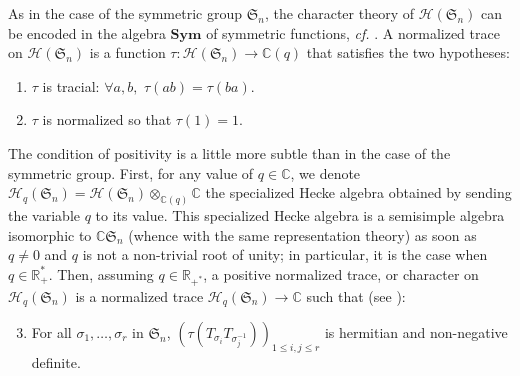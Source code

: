 \documentclass[smallextended,nospthms]{svjour3}
\theoremstyle{remark}
\newcommand{\R}{\mathbb{R}}
\newcommand{\C}{\mathbb{C}}
\newcommand{\hecke}{\mathscr{H}}
\newcommand{\sym}{\mathfrak{S}}
\newcommand{\Sym}{\mathbf{Sym}}
\begin{document}
As in the case of the symmetric group $\sym_{n}$, the character theory of $\hecke(\sym_{n})$ can be encoded in the algebra $\Sym$ of symmetric functions, \emph{cf.} \cite{Ram91}. A normalized trace on $\hecke(\sym_{n})$ is a function $\tau:\hecke(\sym_{n}) \to \C(q)$ that satisfies the two hypotheses:\vspace{2mm}
\begin{enumerate}
\item $\tau$ is tracial: $\forall a,b,\,\,\tau(ab)=\tau(ba)$.\vspace{2mm}
\item $\tau$ is normalized so that $\tau(1)=1$. \vspace{2mm}
\end{enumerate} 
The condition of positivity is a little more subtle than in the case of the symmetric group. First, for any value of $q \in \C$, we denote $\hecke_{q}(\sym_{n}) = \hecke(\sym_{n})\otimes_{\C(q)}\C$ the specialized Hecke algebra obtained by sending the variable $q$ to its value. This specialized Hecke algebra is a semisimple algebra isomorphic to $\C\sym_{n}$ (whence with the same representation theory) as soon as $q\neq0$ and $q$ is not a non-trivial root of unity; in particular, it is the case when $q \in \R_{+}^{*}$. Then, assuming $q \in \R_{+^{*}}$, a positive normalized trace, or character on $\hecke_{q}(\sym_{n})$ is a normalized trace $\hecke_{q}(\sym_{n})\to \C$ such that (see \cite{KV89}):\vspace{2mm}
\begin{enumerate}
\setcounter{enumi}{2}
\item For all $\sigma_{1},\ldots,\sigma_{r}$ in $\sym_{n}$, $(\tau(T_{\sigma_{i}}T_{\sigma_{j}^{-1}}))_{1\leq i,j\leq r}$ is hermitian and non-negative definite.
\end{enumerate}\bigskip
\bigskip
\end{document}

